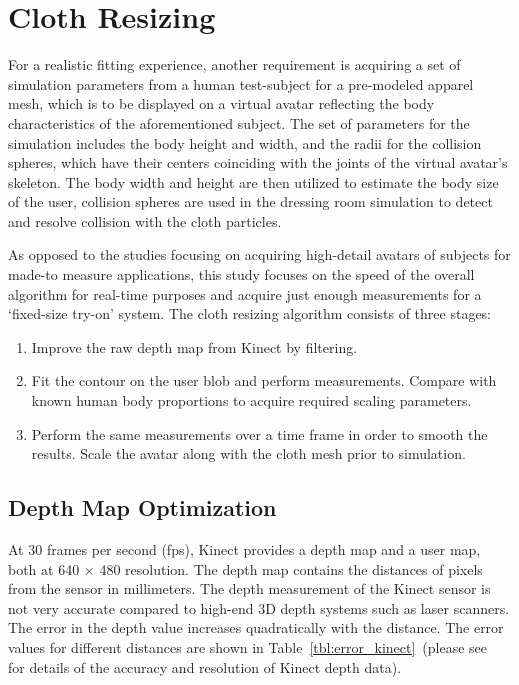 \chapter{Cloth Resizing}
\label{chapter_cloth_resizing}
For a realistic fitting experience, another requirement is acquiring a set of simulation parameters from a human test-subject for a pre-modeled apparel mesh, which is to be displayed on a virtual avatar reflecting the body characteristics of the aforementioned subject.  The set of parameters for the simulation includes the body height and width, and the radii for the collision spheres, which have their centers coinciding with the joints of the virtual avatar's skeleton. The body width and height are then utilized to estimate the body size of the user, collision spheres are used in the dressing room simulation to detect and resolve collision with the cloth particles.

As opposed to the studies focusing on acquiring high-detail avatars of subjects for made-to measure applications, this study focuses on the speed of the overall algorithm for real-time purposes and acquire just enough measurements for a `fixed-size try-on' system.   
The cloth resizing algorithm consists of three stages:
\begin{enumerate}
\item Improve the raw depth map from Kinect by filtering.
\item Fit the contour on the user blob and perform measurements. Compare with known human body proportions to acquire required scaling parameters.
\item Perform the same measurements over a time frame in order to smooth the results. Scale the avatar along with the cloth mesh prior to simulation.
\end{enumerate}

\section{Depth Map Optimization}
\label{section_depth_map_optimization}
At 30 frames per second (fps), Kinect provides a depth map and a user map, both at 640 $\times$ 480 resolution. The depth map contains the distances of pixels from the sensor in millimeters. The depth measurement of the Kinect sensor is not very accurate compared to high-end 3D depth systems such as laser scanners. The error in the depth value increases quadratically with the distance. The error values for different distances are shown in Table~\ref{tbl:error_kinect}~(please see~\cite{Kourosh2012} for details of the accuracy and resolution of Kinect depth data).

